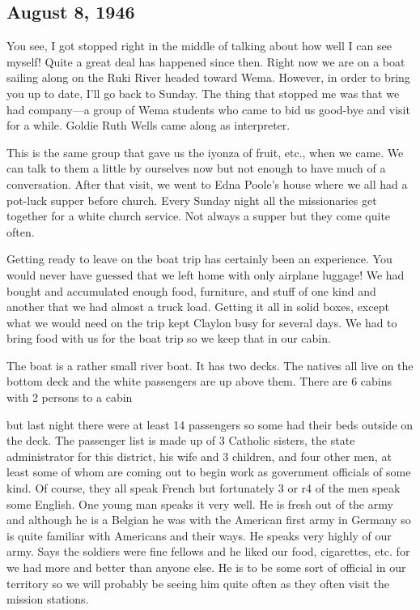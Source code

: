 \documentclass[
]{book}
\begin{document}
\hypertarget{august-8-1946}{%
\subsection{August 8, 1946}\label{august-8-1946}}

You see, I got stopped right in the middle of talking about how well I can see myself! Quite a great deal has happened since then. Right now we are on a boat sailing along on the Ruki River headed toward Wema. However, in order to bring you up to date, I'll go back to Sunday. The thing that stopped me was that we had company---a group of Wema students who came to bid us good-bye and visit for a while. Goldie Ruth Wells came along as interpreter.

This is the same group that gave us the iyonza of fruit, etc., when we came. We can talk to them a little by ourselves now but not enough to have much of a conversation. After that visit, we went to Edna Poole's house where we all had a pot-luck supper before church. Every Sunday night all the missionaries get together for a white church service. Not always a supper but they come quite often.

Getting ready to leave on the boat trip has certainly been an experience. You would never have guessed that we left home with only airplane luggage! We had bought and accumulated enough food, furniture, and stuff of one kind and another that we had almost a truck load. Getting it all in solid boxes, except what we would need on the trip kept Claylon busy for several days. We had to bring food with us for the boat trip so we keep that in our cabin.

The boat is a rather small river boat. It has two decks. The natives all live on the bottom deck and the white passengers are up above them. There are 6 cabins with 2 persons to a cabin

but last night there were at least 14 passengers so some had their beds outside on the deck. The passenger list is made up of 3 Catholic sisters, the state administrator for this district, his wife and 3 children, and four other men, at least some of whom are coming out to begin work as government officials of some kind. Of course, they all speak French but fortunately 3 or r4 of the men speak some English. One young man speaks it very well. He is fresh out of the army and although he is a Belgian he was with the American first army in Germany so is quite familiar with Americans and their ways. He speaks very highly of our army. Says the soldiers were fine fellows and he liked our food, cigarettes, etc. for we had more and better than anyone else. He is to be some sort of official in our territory so we will probably be seeing him quite often as they often visit the mission stations.
\end{document}
